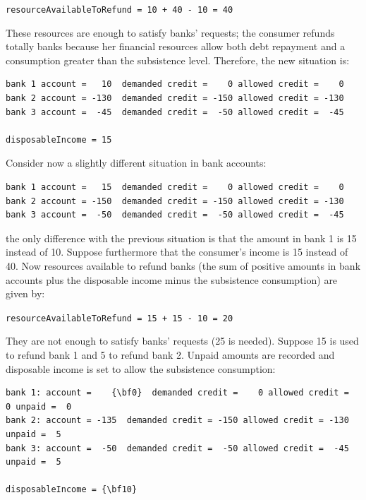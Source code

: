 \documentclass{book}
\begin{document}
\verb/resourceAvailableToRefund = 10 + 40 - 10 = 40/

These resources are enough to satisfy banks' requests; the consumer refunds totally banks because her financial resources allow both debt repayment and a consumption greater than the subsistence level. 
Therefore, the new situation is:

\begin{verbatim}
bank 1 account =   10  demanded credit =    0 allowed credit =    0
bank 2 account = -130  demanded credit = -150 allowed credit = -130 
bank 3 account =  -45  demanded credit =  -50 allowed credit =  -45

disposableIncome = 15
\end{verbatim}



Consider now a slightly different situation in bank accounts:
\begin{verbatim}
bank 1 account =   15  demanded credit =    0 allowed credit =    0
bank 2 account = -150  demanded credit = -150 allowed credit = -130 
bank 3 account =  -50  demanded credit =  -50 allowed credit =  -45
\end{verbatim}
the only difference with the previous situation is that the amount in bank 1 is 15 instead of 10.
Suppose furthermore that the consumer's income is 15 instead of 40. Now resources available to refund banks (the sum of positive amounts in bank accounts plus the disposable income minus the subsistence consumption) are given by:

\verb/resourceAvailableToRefund = 15 + 15 - 10 = 20/

They are not enough to satisfy banks' requests (25 is needed). Suppose 15 is used to refund bank 1 and 5 to refund bank 2. Unpaid amounts are recorded and disposable income is set to allow the subsistence consumption:

\begin{Verbatim}[commandchars=\\\{\}]
bank 1: account =    {\bf0}  demanded credit =    0 allowed credit =    0 unpaid =  0
bank 2: account = -135  demanded credit = -150 allowed credit = -130 unpaid =  5
bank 3: account =  -50  demanded credit =  -50 allowed credit =  -45 unpaid =  5

disposableIncome = {\bf10}
\end{Verbatim}
\end{document}
